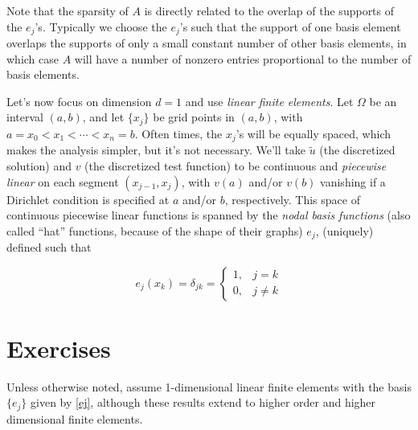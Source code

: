 \documentclass{article}
\begin{document}
Note that the sparsity of \(A\) is directly related to the overlap of the supports of the \(e_j\)'s.  Typically we choose the \(e_j\)'s such that the support of one basis element overlaps the supports of only a small constant number of other basis elements, in which case \(A\) will have a number of nonzero entries proportional to the number of basis elements.

Let's now focus on dimension \(d = 1\) and use {\em linear finite elements}.  Let \(\Omega\) be an interval \((a,b)\), and let \(\{x_j\}\) be grid points in \((a,b)\), with \(a = x_0 < x_1 < \dotsm < x_n = b\).  Often times, the \(x_j\)'s will be equally spaced, which makes the analysis simpler, but it's not necessary.  We'll take \(\tilde{u}\) (the discretized solution) and \(v\) (the discretized test function) to be continuous and {\em piecewise linear} on each segment \((x_{j-1}, x_j)\), with \(v(a)\) and/or \(v(b)\) vanishing if a Dirichlet condition is specified at \(a\) and/or \(b\), respectively.  This space of continuous piecewise linear functions is spanned by the {\em nodal basis functions} (also called ``hat'' functions, because of the shape of their graphs) \(e_j\), (uniquely) defined such that

\begin{equation}\label{ej}
e_j(x_k) = \delta_{jk} = \begin{cases} 1, & j = k \\ 0, & j \neq k \end{cases}
\end{equation}

\section{Exercises}

Unless otherwise noted, assume 1-dimensional linear finite elements with the basis \(\{e_j\}\) given by \eqref{ej}, although these results extend to higher order and higher dimensional finite elements.
\end{document}
